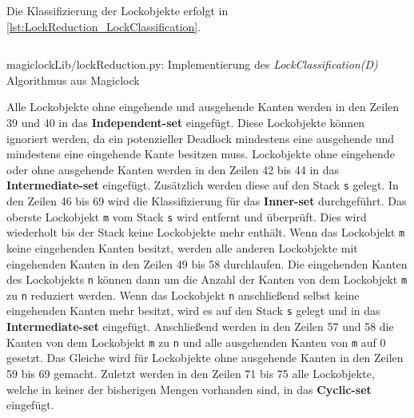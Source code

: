 Die Klassifizierung der Lockobjekte erfolgt in
\cref{lst:LockReduction_LockClassification}.
\begin{listing}[ht]
  \inputminted[frame=lines,linenos,firstline=35,lastline=77]{python}{./Python/magiclockLib/lockReduction.py}
  \caption{magiclockLib/lockReduction.py: Implementierung des \emph{LockClassification(D)} Algorithmus aus Magiclock\autocite[5]{MagicLock}}
  \label{lst:LockReduction_LockClassification}
\end{listing}
Alle Lockobjekte ohne eingehende und ausgehende Kanten werden in den Zeilen 39
und 40 in das \textbf{Independent-set} eingefügt. Diese Lockobjekte können
ignoriert werden, da ein potenzieller Deadlock mindestens eine ausgehende und
mindestens eine eingehende Kante besitzen muss. Lockobjekte ohne eingehende oder
ohne ausgehende Kanten werden in den Zeilen 42 bis 44 in das
\textbf{Intermediate-set} eingefügt. Zusätzlich werden diese auf den Stack
\texttt{s} gelegt. In den Zeilen 46 bis 69 wird die Klassifizierung für das
\textbf{Inner-set} durchgeführt. Das oberste Lockobjekt \texttt{m} vom Stack \texttt{s}
wird entfernt und überprüft. Dies wird wiederholt bis der Stack keine
Lockobjekte mehr enthält. Wenn das Lockobjekt \texttt{m} keine eingehenden
Kanten besitzt, werden alle anderen Lockobjekte mit eingehenden Kanten in den
Zeilen 49 bis 58 durchlaufen. Die eingehenden Kanten des Lockobjekts \texttt{n}
können dann um die Anzahl der Kanten von dem Lockobjekt \texttt{m} zu \texttt{n}
reduziert werden. Wenn das Lockobjekt \texttt{n} anschließend selbst keine
eingehenden Kanten mehr besitzt, wird es auf den Stack \texttt{s} gelegt und in
das \textbf{Intermediate-set} eingefügt. Anschließend werden in den Zeilen 57
und 58 die Kanten von dem Lockobjekt \texttt{m} zu \texttt{n} und alle
ausgehenden Kanten von \texttt{m} auf 0 gesetzt. Das Gleiche wird für
Lockobjekte ohne ausgehende Kanten in den Zeilen 59 bis 69 gemacht. Zuletzt
werden in den Zeilen 71 bis 75 alle Lockobjekte, welche in keiner der bisherigen
Mengen vorhanden sind, in das \textbf{Cyclic-set} eingefügt.

